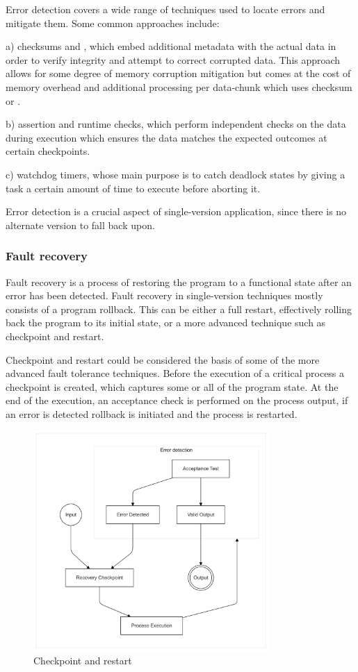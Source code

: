 Error detection covers a wide range of techniques used to locate errors and mitigate them. Some common approaches include:

a) checksums and , which embed additional metadata with the actual data in order to verify integrity and attempt to correct corrupted data. This approach allows for some degree of memory corruption mitigation but comes at the cost of memory overhead and additional processing per data-chunk which uses checksum or .

b) assertion and runtime checks, which perform independent checks on the data during execution which ensures the data matches the expected outcomes at certain checkpoints.

c) watchdog timers, whose main purpose is to catch deadlock states by giving a task a certain amount of time to execute before aborting it.

Error detection is a crucial aspect of single-version application, since there is no alternate version to fall back upon.

\subsubsection{Fault recovery}

Fault recovery is a process of restoring the program to a functional state after an error has been detected. Fault recovery in single-version techniques mostly consists of a program rollback. This can be either a full restart, effectively rolling back the program to its initial state, or a more advanced technique such as checkpoint and restart.

Checkpoint and restart could be considered the basis of some of the more advanced fault tolerance techniques. Before the execution of a critical process a checkpoint is created, which captures some or all of the program state. At the end of the execution, an acceptance check is performed on the process output, if an error is detected rollback is initiated and the process is restarted.

\begin{figure}[hbt]
    \centering
    \includegraphics[width=0.8\textwidth]{diagrams/checkpoint/checkpoint.png}
    \caption{Checkpoint and restart}
    \label{fig:checkpoint}
\end{figure}

